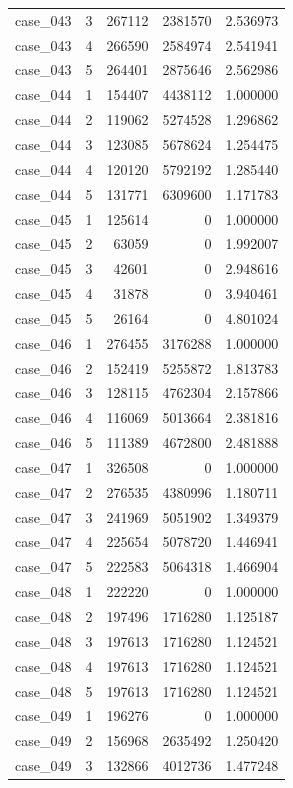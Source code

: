 \begin{longtable}{lrrrr}
case\_043 & 3 & 267112 & 2381570 & 2.536973 \\
case\_043 & 4 & 266590 & 2584974 & 2.541941 \\
case\_043 & 5 & 264401 & 2875646 & 2.562986 \\
case\_044 & 1 & 154407 & 4438112 & 1.000000 \\
case\_044 & 2 & 119062 & 5274528 & 1.296862 \\
case\_044 & 3 & 123085 & 5678624 & 1.254475 \\
case\_044 & 4 & 120120 & 5792192 & 1.285440 \\
case\_044 & 5 & 131771 & 6309600 & 1.171783 \\
case\_045 & 1 & 125614 & 0 & 1.000000 \\
case\_045 & 2 & 63059 & 0 & 1.992007 \\
case\_045 & 3 & 42601 & 0 & 2.948616 \\
case\_045 & 4 & 31878 & 0 & 3.940461 \\
case\_045 & 5 & 26164 & 0 & 4.801024 \\
case\_046 & 1 & 276455 & 3176288 & 1.000000 \\
case\_046 & 2 & 152419 & 5255872 & 1.813783 \\
case\_046 & 3 & 128115 & 4762304 & 2.157866 \\
case\_046 & 4 & 116069 & 5013664 & 2.381816 \\
case\_046 & 5 & 111389 & 4672800 & 2.481888 \\
case\_047 & 1 & 326508 & 0 & 1.000000 \\
case\_047 & 2 & 276535 & 4380996 & 1.180711 \\
case\_047 & 3 & 241969 & 5051902 & 1.349379 \\
case\_047 & 4 & 225654 & 5078720 & 1.446941 \\
case\_047 & 5 & 222583 & 5064318 & 1.466904 \\
case\_048 & 1 & 222220 & 0 & 1.000000 \\
case\_048 & 2 & 197496 & 1716280 & 1.125187 \\
case\_048 & 3 & 197613 & 1716280 & 1.124521 \\
case\_048 & 4 & 197613 & 1716280 & 1.124521 \\
case\_048 & 5 & 197613 & 1716280 & 1.124521 \\
case\_049 & 1 & 196276 & 0 & 1.000000 \\
case\_049 & 2 & 156968 & 2635492 & 1.250420 \\
case\_049 & 3 & 132866 & 4012736 & 1.477248 \\

\end{longtable}
